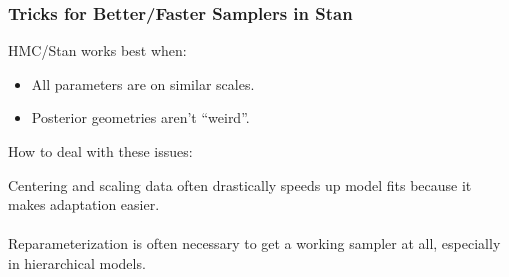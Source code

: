 \documentclass[xcolor=dvipsnames]{beamer}
\begin{document}
\begin{frame}[fragile]
\frametitle{Tricks for Better/Faster Samplers in Stan}
HMC/Stan works best when:
\begin{itemize}
\item All parameters are on similar scales.
\item Posterior geometries aren't ``weird''.
\end{itemize}
How to deal with these issues:

Centering and scaling data often drastically speeds up model fits because it makes adaptation easier.\\~\\

Reparameterization is often necessary to get a working sampler at all, especially in hierarchical models.
\end{frame}
\end{document}
